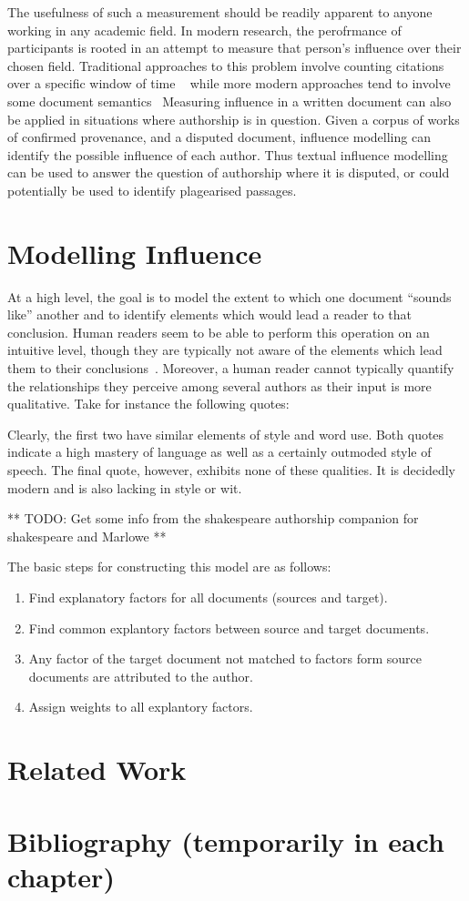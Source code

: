 \documentclass[../dissertation.tex]{subfiles}
\begin{document}
The usefulness of such a measurement should be readily apparent to
anyone working in any academic field.  In modern research, the
perofrmance of participants is rooted in an attempt to measure that
person's influence over their chosen field.  Traditional approaches to
this problem involve counting citations over a specific window of time
~\cite{adler2009} while more modern approaches tend to involve some
document semantics~\cite{dietz2007, jiang2014, **buneman**} Measuring
influence in a written document can also be applied in situations
where authorship is in question.  Given a corpus of works of confirmed
provenance, and a disputed document, influence modelling can identify
the possible influence of each author.  Thus textual influence
modelling can be used to answer the question of authorship where it is
disputed, or could potentially be used to identify plagearised
passages.


\section{Modelling Influence}
At a high level, the goal is to model the extent to which one document
``sounds like'' another and to identify elements which would lead a
reader to that conclusion.  Human readers seem to be able to perform
this operation on an intuitive level, though they are typically not
aware of the elements which lead them to their
conclusions~\cite{craig2009}.  Moreover, a human reader cannot
typically quantify the relationships they perceive among several
authors as their input is more qualitative.  Take for instance the
following quotes:


Clearly, the first two have similar elements of style and word use.
Both quotes indicate a high mastery of language as well as a certainly
outmoded style of speech.  The final quote, however, exhibits none of
these qualities.  It is decidedly modern and is also lacking in style or
wit.  


** TODO: Get some info from the shakespeare authorship companion for
shakespeare and Marlowe **

The basic steps for constructing this model are as follows:
\begin{enumerate}
    \item Find explanatory factors for all documents (sources and
        target).
    \item Find common explantory factors between source and target
        documents.  
    \item Any factor of the target document not matched to factors
        form source documents are attributed to the author.
    \item Assign weights to all explantory factors.
\end{enumerate}



\section{Related Work}

\section{Bibliography (temporarily in each chapter)}


\end{document}
